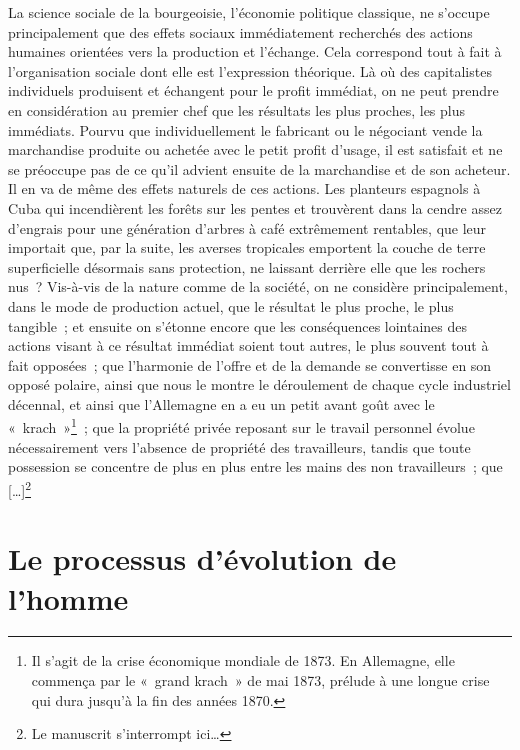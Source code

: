 \documentclass[french,twoside]{book} %
\begin{document}
La science sociale de la bourgeoisie, l’économie politique classique, ne s’occupe principalement que des effets sociaux immédiatement recherchés des actions humaines orientées vers la production et l’échange. Cela correspond tout à fait à l’organisation sociale dont elle est l’expression théorique. Là où des capitalistes individuels produisent et échangent pour le profit immédiat, on ne peut prendre en considération au premier chef que les résultats les plus proches, les plus immédiats. Pourvu que individuellement le fabricant ou le négociant vende la marchandise produite ou achetée avec le petit profit d’usage, il est satisfait et ne se préoccupe pas de ce qu’il advient ensuite de la marchandise et de son acheteur. Il en va de même des effets naturels de ces actions. Les planteurs espagnols à Cuba qui incendièrent les forêts sur les pentes et trouvèrent dans la cendre assez d’engrais pour une génération d’arbres à café extrêmement rentables, que leur importait que, par la suite, les averses tropicales emportent la couche de terre superficielle désormais sans protection, ne laissant derrière elle que les rochers nus ? Vis-à-vis de la nature comme de la société, on ne considère principalement, dans le mode de production actuel, que le résultat le plus proche, le plus tangible ; et ensuite on s’étonne encore que les conséquences lointaines des actions visant à ce résultat immédiat soient tout autres, le plus souvent tout à fait opposées ; que l’harmonie de l’offre et de la demande se convertisse en son opposé polaire, ainsi que nous le montre le déroulement de chaque cycle industriel décennal, et ainsi que l’Allemagne en a eu un petit avant goût avec le « krach »\footnote{Il s’agit de la crise économique mondiale de 1873. En Allemagne, elle commença par le « grand krach » de mai 1873, prélude à une longue crise qui dura jusqu’à la fin des années 1870.} ; que la propriété privée reposant sur le travail personnel évolue nécessairement vers l’absence de propriété des travailleurs, tandis que toute possession se concentre de plus en plus entre les mains des non travailleurs ; que […]\footnote{Le manuscrit s’interrompt ici…}

\section[{Le processus d’évolution de l’homme}]{Le processus d’évolution de l’homme\protect\footnotemark }
\renewcommand{\leftmark}{Le processus d’évolution de l’homme}
\end{document}
